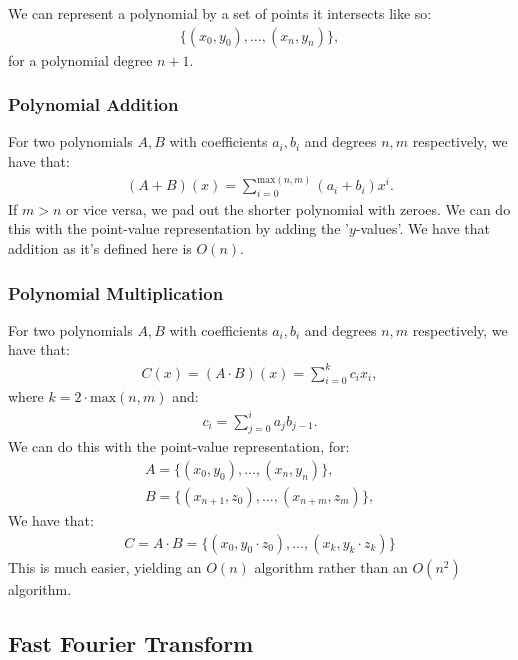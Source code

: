 \documentclass[a4paper, 12pt, twoside]{article}
\begin{document}
We can represent a polynomial by a set of points it intersects like so:
\begin{gather*}
  \{(x_0, y_0), \ldots, (x_n, y_n)\},
\end{gather*} for a polynomial degree $n + 1$.

\subsubsection{Polynomial Addition}

For two polynomials $A, B$ with coefficients $a_i, b_i$ and degrees $n, m$ 
respectively, we have that: \begin{gather*}
  (A + B)(x) =  \sum_{i = 0}^{\text{max}(n, m)}(a_i + b_i)x^i.
\end{gather*} If $m > n$ or vice versa, we pad out the shorter
polynomial with zeroes. We can do this with the point-value representation
by adding the '$y$-values'. We have that addition as it's defined here
is $O(n)$.

\subsubsection{Polynomial Multiplication}

For two polynomials $A, B$ with coefficients $a_i, b_i$ and degrees $n, m$ 
respectively, we have that: \begin{gather*}
  C(x) = (A \cdot B)(x) = \sum_{i = 0}^{k} c_ix_i,
\end{gather*} where $k = 2 \cdot \text{max}(n, m)$ and: \begin{gather*}
  c_i = \sum_{j = 0}^ia_jb_{j - 1}.
\end{gather*} We can do this with the point-value representation,
for: \begin{gather*}
  A = \{(x_0, y_0), \ldots, (x_n, y_n)\}, \\
  B = \{(x_{n + 1}, z_0), \ldots, (x_{n + m}, z_m)\},
\end{gather*} We have that: \begin{gather*}
  C = A \cdot B = \{(x_0, y_0 \cdot z_0), \ldots, (x_k, y_k \cdot z_k)\}
\end{gather*} This is much easier, yielding
an $O(n)$ algorithm rather than an $O(n^2)$ algorithm.

\subsection{Fast Fourier Transform}
\end{document}
